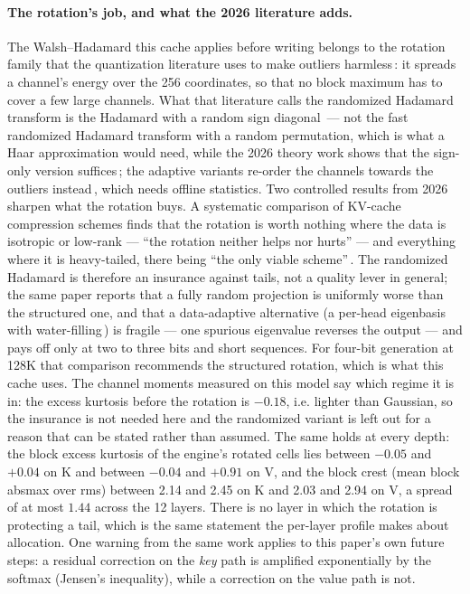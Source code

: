\documentclass[10pt,twocolumn]{article}
\begin{document}
\paragraph{The rotation's job, and what the 2026 literature adds.} The Walsh--Hadamard this cache applies before writing belongs to the rotation family that the quantization literature uses to make outliers harmless\,\cite{quarot,rotatekv}: it spreads a channel's energy over the 256 coordinates, so that no block maximum has to cover a few large channels. What that literature calls the randomized Hadamard transform is the Hadamard with a random sign diagonal\,\cite{quip} --- not the fast randomized Hadamard transform with a random permutation, which is what a Haar approximation would need, while the 2026 theory work shows that the sign-only version suffices\,\cite{rht-theory}; the adaptive variants re-order the channels towards the outliers instead\,\cite{rotatekv}, which needs offline statistics. Two controlled results from 2026 sharpen what the rotation buys. A systematic comparison of KV-cache compression schemes finds that the rotation is worth nothing where the data is isotropic or low-rank --- ``the rotation neither helps nor hurts'' --- and everything where it is heavy-tailed, there being ``the only viable scheme''\,\cite{amd-kv-ablation}. The randomized Hadamard is therefore an insurance against tails, not a quality lever in general; the same paper reports that a fully random projection is uniformly worse than the structured one, and that a data-adaptive alternative (a per-head eigenbasis with water-filling\,\cite{spectralquant}) is fragile --- one spurious eigenvalue reverses the output --- and pays off only at two to three bits and short sequences. For four-bit generation at 128K that comparison recommends the structured rotation, which is what this cache uses. The channel moments measured on this model say which regime it is in: the excess kurtosis before the rotation is $-0.18$, i.e. lighter than Gaussian, so the insurance is not needed here and the randomized variant is left out for a reason that can be stated rather than assumed. The same holds at every depth: the block excess kurtosis of the engine's rotated cells lies between $-0.05$ and $+0.04$ on K and between $-0.04$ and $+0.91$ on V, and the block crest (mean block absmax over rms) between 2.14 and 2.45 on K and 2.03 and 2.94 on V, a spread of at most $1.44$ across the 12 layers. There is no layer in which the rotation is protecting a tail, which is the same statement the per-layer profile makes about allocation. One warning from the same work applies to this paper's own future steps: a residual correction on the \emph{key} path is amplified exponentially by the softmax (Jensen's inequality), while a correction on the value path is not.
\end{document}
